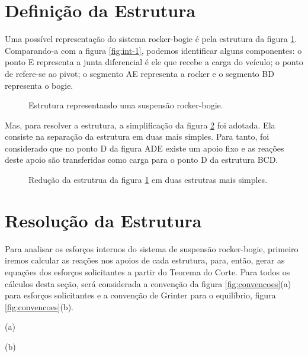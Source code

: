 \documentclass[12pt]{article}
\begin{document}
\pagebreak

\section{Definição da Estrutura}

Uma possível representação do sistema rocker-bogie é pela estrutura da figura \ref{fig:diagrama-base}. Comparando-a com a figura \ref{fig:int-1}, podemos identificar alguns componentes: o ponto E representa a junta diferencial é ele que recebe a carga do veículo; o ponto de refere-se ao pivot; o segmento AE representa a rocker e o segmento BD representa o bogie.

\begin{figure}[h!]
  \centering
  \resizebox{.6\textwidth}{!}{}
  \smallskip
  \caption{Estrutura representando uma suspensão rocker-bogie.}
  \label{fig:diagrama-base}
\end{figure}

Mas, para resolver a estrutura, a simplificação da figura \ref{fig:diagrama-simpl} foi adotada. Ela consiste na separação da estrutura em duas mais simples. Para tanto, foi considerado que no ponto D da figura ADE existe um apoio fixo e as reações deste apoio são transferidas como carga para o ponto D da estrutura BCD.

\begin{figure}[h!]
  \centering
  \resizebox{.7\textwidth}{!}{}
  \smallskip
  \caption{Redução da estrutrua da figura \ref{fig:diagrama-base} em duas estrutras mais simples.}
  \label{fig:diagrama-simpl}
\end{figure}

\pagebreak

\section{Resolução da Estrutura}

\begin{minipage}{.48\textwidth}
  Para analisar os esforços internos do sistema de suspensão rocker-bogie, primeiro iremos calcular as reações nos apoios de cada estrutura, para, então, gerar as equações dos esforços solicitantes a partir do Teorema do Corte. Para todos os cálculos desta seção, será considerada a convenção da figura \ref{fig:convencoes}(a) para esforços solicitantes e a convenção de Grinter para o equilíbrio, figura \ref{fig:convencoes}(b).
\end{minipage}%
\hfill%
\begin{minipage}{.45\textwidth}
  \begin{minipage}{.7\textwidth}
    \centering
    \resizebox{\linewidth}{!}{}
    (a)
  \end{minipage}%
  \hfill%
  \begin{minipage}{.25\textwidth}
    \centering
    \resizebox{\linewidth}{!}{}
    (b)
  \end{minipage}
  \label{fig:convencoes}
\end{minipage}
\end{document}
